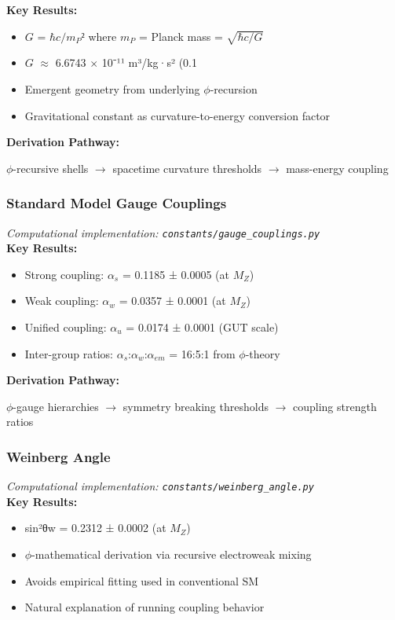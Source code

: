 \textbf{Key Results:}
\begin{itemize}
    \item $G$ = $\hbar c / m_P²$ where $m_P$ = Planck mass = $\sqrt{\hbar c / G}$
    \item $G$ $\approx$ 6.6743 $\times$ 10⁻¹¹ m³/kg·s² (0.1%
    \item Emergent geometry from underlying $\phi$-recursion
    \item Gravitational constant as curvature-to-energy conversion factor
\end{itemize}

\textbf{Derivation Pathway:}

$\phi$-recursive shells $\to$ spacetime curvature thresholds $\to$ mass-energy coupling

\subsubsection{Standard Model Gauge Couplings}
\textit{Computational implementation: \texttt{constants/gauge_couplings.py}}\\

\textbf{Key Results:}
\begin{itemize}
    \item Strong coupling: $\alpha_s$ = 0.1185 ± 0.0005 (at $M_Z$)
    \item Weak coupling: $\alpha_w$ = 0.0357 ± 0.0001 (at $M_Z$)
    \item Unified coupling: $\alpha_u$ = 0.0174 ± 0.0001 (GUT scale)
    \item Inter-group ratios: $\alpha_s$:$\alpha_w$:$\alpha_{em}$ = 16:5:1 from $\phi$-theory
\end{itemize}

\textbf{Derivation Pathway:}

$\phi$-gauge hierarchies $\to$ symmetry breaking thresholds $\to$ coupling strength ratios

\subsubsection{Weinberg Angle}
\textit{Computational implementation: \texttt{constants/weinberg_angle.py}}\\

\textbf{Key Results:}
\begin{itemize}
    \item sin²θw = 0.2312 ± 0.0002 (at $M_Z$)
    \item $\phi$-mathematical derivation via recursive electroweak mixing
    \item Avoids empirical fitting used in conventional SM
    \item Natural explanation of running coupling behavior
\end{itemize}

